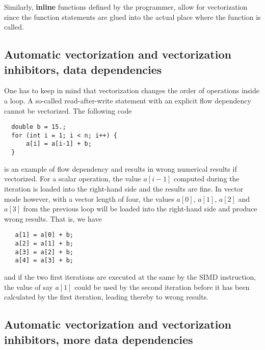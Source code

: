 \documentclass[%
oneside,                 %
final,                   %
10pt]{article}
\begin{document}
Similarly, \textbf{inline} functions defined by the programmer, allow for vectorization since the function statements are glued into the actual place where the function is called. 

\subsection*{Automatic vectorization and vectorization inhibitors, data dependencies}

One has to keep in mind that vectorization changes the order of operations inside a loop. A so-called
read-after-write statement with an explicit flow dependency cannot be vectorized. The following code





\begin{verbatim}
  double b = 15.;
  for (int i = 1; i < n; i++) {
      a[i] = a[i-1] + b;
  }

\end{verbatim}

is an example of flow dependency and results in wrong numerical results if vectorized. For a scalar operation, the value $a[i-1]$ computed during the iteration is loaded into the right-hand side and the results are fine. In vector mode however, with a vector length of four, the values $a[0]$, $a[1]$, $a[2]$ and $a[3]$ from the previous loop will be loaded into the right-hand side and produce wrong results. That is, we have





\begin{verbatim}
   a[1] = a[0] + b;
   a[2] = a[1] + b;
   a[3] = a[2] + b;
   a[4] = a[3] + b;

\end{verbatim}

and if the two first iterations are  executed at the same by the SIMD instruction, the value of say $a[1]$ could be used by the second iteration before it has been calculated by the first iteration, leading thereby to wrong results.

\subsection*{Automatic vectorization and vectorization inhibitors, more data dependencies}
\end{document}
